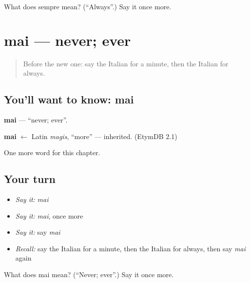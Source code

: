 \begin{tcolorbox}[breakable,colback=teal!4,colframe=teal!35!black,title={Before you move on}]
What does sempre mean? (\textquotedblleft{}Always\textquotedblright{}.) Say it once more.
\end{tcolorbox}
\section[mai]{mai — never; ever}

\label{lesson:IT-C79-mai}



\begin{quote}
Before the new one: say the Italian for a minute, then the Italian for always.
\end{quote}

\subsection*{You'll want to know: mai}
\textbf{mai} — \textquotedblleft{}never; ever\textquotedblright{}.

\begin{cousinweb}
\textbf{mai} $\leftarrow$ Latin \emph{magis}, \textquotedblleft{}more\textquotedblright{} — inherited. (EtymDB 2.1)
\end{cousinweb}

\begin{grammarlens}[title={What you've built}]
One more word for this chapter.
\end{grammarlens}

\subsection*{Your turn}
\begin{itemize}
\raggedright
  \item \emph{Say it:} \emph{mai}
  \item \emph{Say it:} \emph{mai}, once more
  \item \emph{Say it:} say \emph{mai}
  \item \emph{Recall:} say the Italian for a minute, then the Italian for always, then say \emph{mai} again
\end{itemize}

\begin{tcolorbox}[breakable,colback=teal!4,colframe=teal!35!black,title={Before you move on}]
What does mai mean? (\textquotedblleft{}Never; ever\textquotedblright{}.) Say it once more.
\end{tcolorbox}

